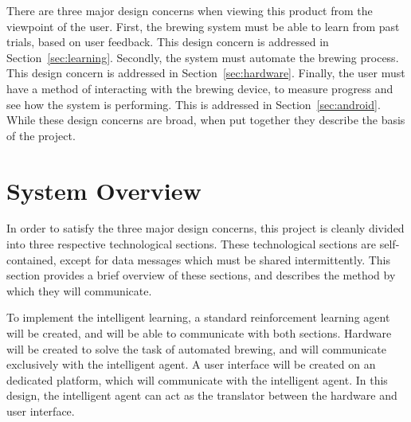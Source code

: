 \documentclass[draftclsnofoot,onecolumn,letterpaper,10pt]{IEEEtran}
\begin{document}
There are three major design concerns when viewing this product from the viewpoint of the user.
First, the brewing system must be able to learn from past trials, based on user feedback. 
This design concern is addressed in Section~\ref{sec:learning}.
Secondly, the system must automate the brewing process. 
This design concern is addressed in Section~\ref{sec:hardware}.
Finally, the user must have a method of interacting with the brewing device, to measure progress and see how the system is performing.
This is addressed in Section~\ref{sec:android}.
While these design concerns are broad, when put together they describe the basis of the project.

\section{System Overview}
In order to satisfy the three major design concerns, this project is cleanly divided into three respective technological sections.
These technological sections are self-contained, except for data messages which must be shared intermittently.
This section provides a brief overview of these sections, and describes the method by which they will communicate.

To implement the intelligent learning, a standard reinforcement learning agent will be created, and will be able to communicate with both sections.
Hardware will be created to solve the task of automated brewing, and will communicate exclusively with the intelligent agent.
A user interface will be created on an dedicated platform, which will communicate with the intelligent agent.
In this design, the intelligent agent can act as the translator between the hardware and user interface.
\end{document}

